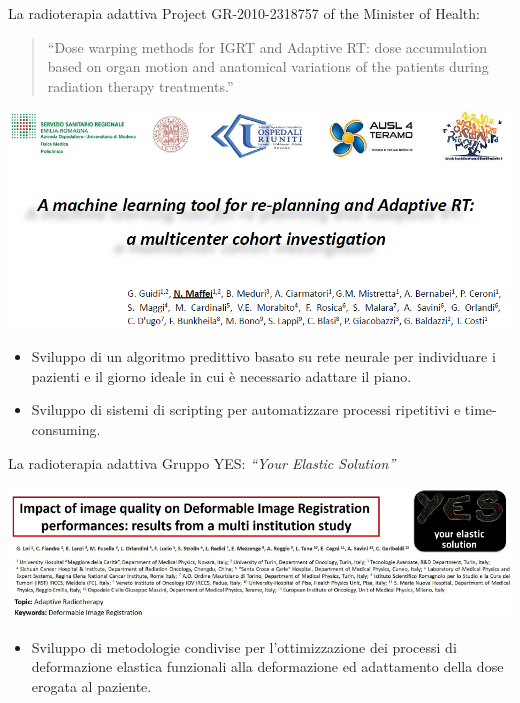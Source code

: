 \documentclass{beamer}
\begin{document}
\begin{frame}{La radioterapia adattiva}
\footnotesize
Project GR-2010-2318757 of the Minister of Health:
\begin{quotation}
\scriptsize
``Dose warping methods for IGRT and Adaptive RT: dose accumulation based on organ motion and anatomical variations of the patients during radiation therapy treatments.''
\end{quotation}
\vspace{-.3cm}
\begin{center}
\includegraphics[width=.8\textwidth]{./img/Pub_mod.png}\\ \vspace{.2cm}
\end{center}
\vspace{-.3cm}
\footnotesize
{}
\begin{itemize}
\scriptsize
\item Sviluppo di un algoritmo predittivo basato su rete neurale per individuare i pazienti e il giorno ideale in cui è necessario adattare il piano.
\item Sviluppo di sistemi di scripting per automatizzare processi ripetitivi e time-consuming.
\end{itemize}
\end{frame}


\begin{frame}{La radioterapia adattiva}
\footnotesize
Gruppo YES: \textit{``Your Elastic Solution''}

\vspace{-.1cm}
\begin{center}
\includegraphics[width=\textwidth]{./img/Pub_YES.png}\\ \vspace{.2cm}
\end{center}
\vspace{-.1cm}
\footnotesize
{}
\begin{itemize}
\scriptsize
\item Sviluppo di metodologie condivise per l'ottimizzazione dei processi di deformazione elastica funzionali alla deformazione ed adattamento della dose erogata al paziente.
\end{itemize}
\end{frame}
\end{document}
